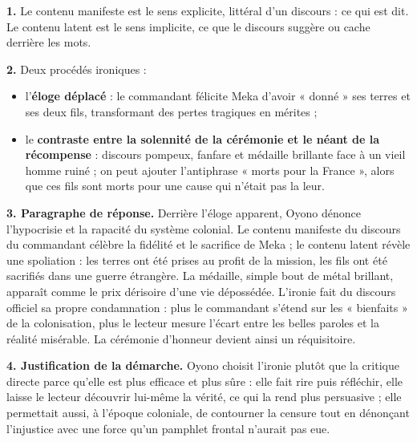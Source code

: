 \documentclass[11pt]{article}
\newcommand{\cle}[1]{{\popxbold\color{popdark}#1}}
\begin{document}
\begin{corrige}
\textbf{1.} Le \cle{contenu manifeste} est le sens explicite, littéral d'un discours : ce qui est dit. Le \cle{contenu latent} est le sens implicite, ce que le discours suggère ou cache derrière les mots.

\textbf{2.} Deux procédés ironiques :
\begin{itemize}
\item l'\textbf{éloge déplacé} : le commandant félicite Meka d'avoir « donné » ses terres et ses deux fils, transformant des pertes tragiques en mérites ;
\item le \textbf{contraste entre la solennité de la cérémonie et le néant de la récompense} : discours pompeux, fanfare et médaille brillante face à un vieil homme ruiné ; on peut ajouter l'antiphrase « morts pour la France », alors que ces fils sont morts pour une cause qui n'était pas la leur.
\end{itemize}

\textbf{3. Paragraphe de réponse.} Derrière l'éloge apparent, Oyono dénonce l'hypocrisie et la rapacité du système colonial. Le contenu manifeste du discours du commandant célèbre la fidélité et le sacrifice de Meka ; le contenu latent révèle une spoliation : les terres ont été prises au profit de la mission, les fils ont été sacrifiés dans une guerre étrangère. La médaille, simple bout de métal brillant, apparaît comme le prix dérisoire d'une vie dépossédée. L'ironie fait du discours officiel sa propre condamnation : plus le commandant s'étend sur les « bienfaits » de la colonisation, plus le lecteur mesure l'écart entre les belles paroles et la réalité misérable. La cérémonie d'honneur devient ainsi un réquisitoire.

\textbf{4. Justification de la démarche.} Oyono choisit l'ironie plutôt que la critique directe parce qu'elle est plus efficace et plus sûre : elle fait rire puis réfléchir, elle laisse le lecteur découvrir lui-même la vérité, ce qui la rend plus persuasive ; elle permettait aussi, à l'époque coloniale, de contourner la censure tout en dénonçant l'injustice avec une force qu'un pamphlet frontal n'aurait pas eue.
\end{corrige}
\end{document}
